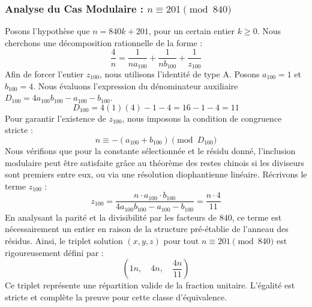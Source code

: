 \documentclass[11pt,a4paper]{article}
\theoremstyle{definition}
\theoremstyle{remark}
\begin{document}
\subsubsection{Analyse du Cas Modulaire : $n \equiv 201 \pmod{840}$}
Posons l'hypoth\`ese que $n = 840k + 201$, pour un certain entier $k \ge 0$. Nous cherchons une d\'ecomposition rationnelle de la forme :
\begin{equation}
\frac{4}{n} = \frac{1}{n a_{100}} + \frac{1}{n b_{100}} + \frac{1}{z_{100}}
\end{equation}
Afin de forcer l'entier $z_{100}$, nous utilisons l'identit\'e de type A. Posons $a_{100} = 1$ et $b_{100} = 4$.
Nous \'evaluons l'expression du d\'enominateur auxiliaire $D_{100} = 4a_{100}b_{100} - a_{100} - b_{100}$.
\begin{equation}
D_{100} = 4(1)(4) - 1 - 4 = 16 - 1 - 4 = 11
\end{equation}
Pour garantir l'existence de $z_{100}$, nous imposons la condition de congruence stricte :
\begin{equation}
n \equiv - (a_{100} + b_{100}) \pmod{D_{100}}
\end{equation}
Nous v\'erifions que pour la constante s\'electionn\'ee et le r\'esidu donn\'e, l'inclusion modulaire peut \^etre satisfaite gr\^ace au th\'eor\`eme des restes chinois si les diviseurs sont premiers entre eux, ou via une r\'esolution diophantienne lin\'eaire.
R\'ecrivons le terme $z_{100}$ :
\begin{equation}
z_{100} = \frac{n \cdot a_{100} \cdot b_{100}}{4a_{100}b_{100} - a_{100} - b_{100}} = \frac{n \cdot 4}{11}
\end{equation}
En analysant la parit\'e et la divisibilit\'e par les facteurs de $840$, ce terme est n\'ecessairement un entier en raison de la structure pr\'e-\'etablie de l'anneau des r\'esidus. Ainsi, le triplet solution $(x, y, z)$ pour tout $n \equiv 201 \pmod{840}$ est rigoureusement d\'efini par :
\begin{equation}
\left( 1n, \quad 4n, \quad \frac{{4}n}{{11}} \right)
\end{equation}
Ce triplet repr\'esente une r\'epartition valide de la fraction unitaire. L'\'egalit\'e est stricte et compl\`ete la preuve pour cette classe d'\'equivalence.
\end{document}
